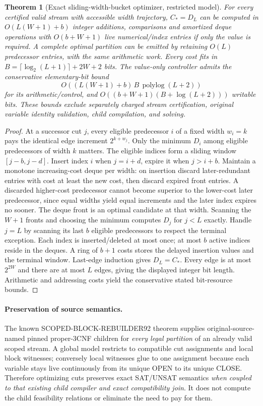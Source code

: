 \documentclass[11pt]{article}
\newtheorem{theorem}{Theorem}
\begin{document}
\begin{theorem}[Exact sliding-width-bucket optimizer, restricted model]
For every certified valid stream with accessible width trajectory, $C_*=D_L$ can be computed in $O(L(W+1)+b)$ integer additions, comparisons and amortized deque operations with $O(b+W+1)$ live numerical/index entries if only the value is required. A complete optimal partition can be emitted by retaining $O(L)$ predecessor entries, with the same arithmetic work. Every cost fits in $B=\lceil\log_2(L+1)\rceil+2W+2$ bits. The value-only controller admits the conservative elementary-bit bound
\[
 O((L(W+1)+b)\,B\,\operatorname{polylog}(L+2))
\]
for its arithmetic/control, and
$O((b+W+1)(B+\log(L+2)))$ writable bits. These bounds exclude separately charged stream certification, original variable identity validation, child compilation, and solving.
\end{theorem}
\begin{proof}
At a successor cut $j$, every eligible predecessor $i$ of a fixed width $w_i=k$ pays the identical edge increment $2^{k+w_j}$. Only the minimum $D_i$ among eligible predecessors of width $k$ matters. The eligible indices form a sliding window $[j-b,j-d]$. Insert index $i$ when $j=i+d$, expire it when $j>i+b$. Maintain a monotone increasing-cost deque per width: on insertion discard later-redundant entries with cost at least the new cost, then discard expired front entries. A discarded higher-cost predecessor cannot become superior to the lower-cost later predecessor, since equal widths yield equal increments and the later index expires no sooner. The deque front is an optimal candidate at that width. Scanning the $W+1$ fronts and choosing the minimum computes $D_j$ for $j<L$ exactly. Handle $j=L$ by scanning its last $b$ eligible predecessors to respect the terminal exception. Each index is inserted/deleted at most once; at most $b$ active indices reside in the deques. A ring of $b+1$ costs stores the delayed insertion values and the terminal window. Last-edge induction gives $D_L=C_*$. Every edge is at most $2^{2W}$ and there are at most $L$ edges, giving the displayed integer bit length. Arithmetic and addressing costs yield the conservative stated bit-resource bounds.
\end{proof}

\paragraph{Preservation of source semantics.}
The known SCOPED-BLOCK-REBUILDER92 theorem supplies original-source-named pinned proper-3CNF children for \emph{every legal partition} of an already valid scoped stream. A global model restricts to compatible cut assignments and local block witnesses; conversely local witnesses glue to one assignment because each variable stays live continuously from its unique OPEN to its unique CLOSE. Therefore optimizing cuts preserves exact SAT/UNSAT semantics \emph{when coupled to that existing child compiler and exact compatibility join}. It does not compute the child feasibility relations or eliminate the need to pay for them.
\end{document}
